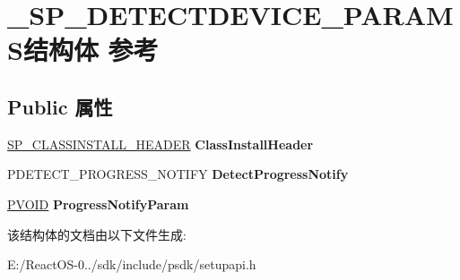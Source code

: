 \hypertarget{struct___s_p___d_e_t_e_c_t_d_e_v_i_c_e___p_a_r_a_m_s}{}\section{\+\_\+\+S\+P\+\_\+\+D\+E\+T\+E\+C\+T\+D\+E\+V\+I\+C\+E\+\_\+\+P\+A\+R\+A\+M\+S结构体 参考}
\label{struct___s_p___d_e_t_e_c_t_d_e_v_i_c_e___p_a_r_a_m_s}
\subsection*{Public 属性}
\begin{DoxyCompactItemize}
\item 
\mbox{\label{struct___s_p___d_e_t_e_c_t_d_e_v_i_c_e___p_a_r_a_m_s_ad3cd132c89f9510f43dde020461845a2}} 
\hyperlink{struct___s_p___c_l_a_s_s_i_n_s_t_a_l_l___h_e_a_d_e_r}{S\+P\+\_\+\+C\+L\+A\+S\+S\+I\+N\+S\+T\+A\+L\+L\+\_\+\+H\+E\+A\+D\+ER} {\bfseries Class\+Install\+Header}
\item 
\mbox{\label{struct___s_p___d_e_t_e_c_t_d_e_v_i_c_e___p_a_r_a_m_s_a1266feaef2e0df0a94361e442f5681b6}} 
P\+D\+E\+T\+E\+C\+T\+\_\+\+P\+R\+O\+G\+R\+E\+S\+S\+\_\+\+N\+O\+T\+I\+FY {\bfseries Detect\+Progress\+Notify}
\item 
\mbox{\label{struct___s_p___d_e_t_e_c_t_d_e_v_i_c_e___p_a_r_a_m_s_acda7765bcdaf317b8dfb3a3ffe82f203}} 
\hyperlink{interfacevoid}{P\+V\+O\+ID} {\bfseries Progress\+Notify\+Param}
\end{DoxyCompactItemize}


该结构体的文档由以下文件生成\+:\begin{DoxyCompactItemize}
\item 
E\+:/\+React\+O\+S-\/0../sdk/include/psdk/setupapi.\+h\end{DoxyCompactItemize}
